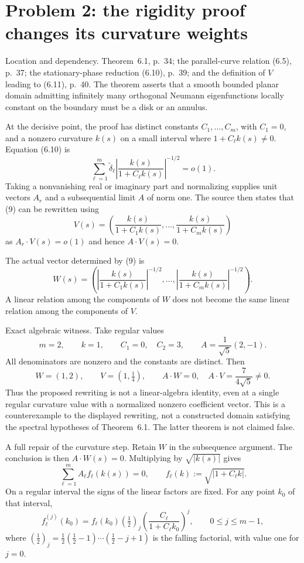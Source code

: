\documentclass[10pt]{article}
\begin{document}
\section*{Problem 2: the rigidity proof changes its curvature weights}
Location and dependency. Theorem 6.1, p. 34; the parallel-curve relation (6.5), p. 37; the stationary-phase reduction (6.10), p. 39; and the definition of \(V\) leading to (6.11), p. 40. The theorem asserts that a smooth bounded planar domain admitting infinitely many orthogonal Neumann eigenfunctions locally constant on the boundary must be a disk or an annulus.\par
At the decisive point, the proof has distinct constants \(C_1,\ldots,C_m\), with \(C_1=0\), and a nonzero curvature \(k(s)\) on a small interval where \(1+C_\ell k(s)\ne0\). Equation (6.10) is \[\sum_{\ell=1}^m\widetilde\delta_\ell
 \left|\frac{k(s)}{1+C_\ell k(s)}\right|^{-1/2}=o(1).
 \tag{9}\] Taking a nonvanishing real or imaginary part and normalizing supplies unit vectors \(A_r\) and a subsequential limit \(A\) of norm one. The source then states that (9) can be rewritten using \[V(s)=\left(
 \frac{k(s)}{1+C_1k(s)},\ldots,
 \frac{k(s)}{1+C_mk(s)}
 \right)
 \tag{10}\] as \(A_r\cdot V(s)=o(1)\) and hence \(A\cdot V(s)=0\).\par
The actual vector determined by (9) is \[W(s)=\left(
 \left|\frac{k(s)}{1+C_1k(s)}\right|^{-1/2},\ldots,
 \left|\frac{k(s)}{1+C_mk(s)}\right|^{-1/2}
 \right).
 \tag{11}\] A linear relation among the components of \(W\) does not become the same linear relation among the components of \(V\).\par
Exact algebraic witness. Take regular values \[m=2,\qquad k=1,\qquad C_1=0,\quad C_2=3,\qquad
 A=\frac1{\sqrt5}(2,-1).\] All denominators are nonzero and the constants are distinct. Then \[W=(1,2),\qquad V=(1,\tfrac14),\qquad
 A\cdot W=0,\quad A\cdot V=\frac7{4\sqrt5}\ne0.
 \tag{12}\] Thus the proposed rewriting is not a linear-algebra identity, even at a single regular curvature value with a normalized nonzero coefficient vector. This is a counterexample to the displayed rewriting, not a constructed domain satisfying the spectral hypotheses of Theorem 6.1. The latter theorem is not claimed false.\par
A full repair of the curvature step. Retain \(W\) in the subsequence argument. The conclusion is then \(A\cdot W(s)=0\). Multiplying by \(\sqrt{|k(s)|}\) gives \[\sum_{\ell=1}^m A_\ell f_\ell(k(s))=0,\qquad
 f_\ell(k):=\sqrt{|1+C_\ell k|}.
 \tag{13}\] On a regular interval the signs of the linear factors are fixed. For any point \(k_0\) of that interval, \[f_\ell^{(j)}(k_0)
 =f_\ell(k_0)
   \left(\tfrac12\right)_{\!j}
   \left(\frac{C_\ell}{1+C_\ell k_0}\right)^j,
 \qquad 0\le j\le m-1,
 \tag{14}\] where \((\frac12)_j=\frac12(\frac12-1)\cdots(\frac12-j+1)\) is the falling factorial, with value one for \(j=0\).\par
\end{document}
